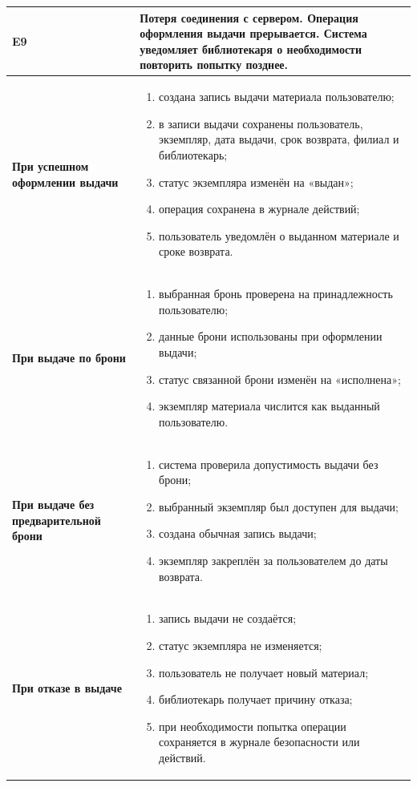 \documentclass[12pt,a4paper]{article}
\begin{document}
\begin{xltabular}{\textwidth}{
				|>{\raggedright\arraybackslash}p{2.7cm}
				|>{\raggedright\arraybackslash}X|
			}
			E9 &
			\textbf{Потеря соединения с сервером.}
			Операция оформления выдачи прерывается. Система уведомляет
			библиотекаря о необходимости повторить попытку позднее. \\
			\hline
			
			
			\textbf{При успешном оформлении выдачи} &
			\begin{enumerate}
				\item создана запись выдачи материала пользователю;
				\item в записи выдачи сохранены пользователь, экземпляр, дата выдачи,
				срок возврата, филиал и библиотекарь;
				\item статус экземпляра изменён на «выдан»;
				\item операция сохранена в журнале действий;
				\item пользователь уведомлён о выданном материале и сроке возврата.
			\end{enumerate} \\
			\hline
			
			\textbf{При выдаче по брони} &
			\begin{enumerate}
				\item выбранная бронь проверена на принадлежность пользователю;
				\item данные брони использованы при оформлении выдачи;
				\item статус связанной брони изменён на «исполнена»;
				\item экземпляр материала числится как выданный пользователю.
			\end{enumerate} \\
			\hline
			
			\textbf{При выдаче без предварительной брони} &
			\begin{enumerate}
				\item система проверила допустимость выдачи без брони;
				\item выбранный экземпляр был доступен для выдачи;
				\item создана обычная запись выдачи;
				\item экземпляр закреплён за пользователем до даты возврата.
			\end{enumerate} \\
			\hline
			
			\textbf{При отказе в выдаче} &
			\begin{enumerate}
				\item запись выдачи не создаётся;
				\item статус экземпляра не изменяется;
				\item пользователь не получает новый материал;
				\item библиотекарь получает причину отказа;
				\item при необходимости попытка операции сохраняется в журнале
				безопасности или действий.
			\end{enumerate} \\
			\hline
			

\end{xltabular}
\end{document}
